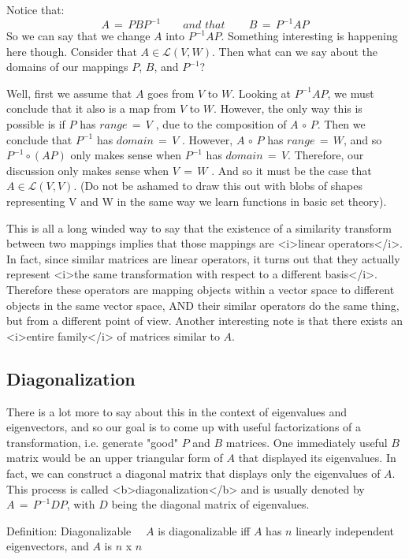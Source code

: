 \documentclass{book}
\begin{document}
    Notice that:$$A\,=\,PBP^{-1}\quad\quad and \,\,that \quad\quad\,B\,=\,P^{-1}AP$$ So we can say that we change $A$ into $P^{-1}AP$. Something interesting is happening here though. Consider that $A \in \mathcal{L}(V,W)$. Then what can we say about the domains of our mappings $P$, $B$, and $P^{-1}$?
    
    Well, first we assume that $A$ goes from $V$ to $W$. Looking at $P^{-1}AP$, we must conclude that it also is a map from $V$ to $W$. However, the only way this is possible is if $P$ has   $range\,=\,V$ , due to the composition of   $A\,\circ\,P$. Then we conclude that $P^{-1}$ has   $domain\,=\,V$ . However,   $A\,\circ\,P$   has   $range\,=\,W$,   and so   $P^{-1}\circ(AP)$     only makes sense when $P^{-1}$ has   $domain\,=\,V$. Therefore, our discussion only makes sense when   $V\,=\,W$ . And so it must be the case that   $A \in \mathcal{L}(V,V)$. (Do not be ashamed to draw this out with blobs of shapes representing V and W in the same way we learn functions in basic set theory).
    
    This is all a long winded way to say that the existence of a similarity transform between two mappings implies that those mappings are <i>linear operators</i>. In fact, since similar matrices are linear operators, it turns out that they actually represent <i>the same transformation with respect to a different basis</i>. Therefore these operators are mapping objects within a vector space to different objects in the same vector space, AND their similar operators do the same thing, but from a different point of view. Another interesting note is that there exists an <i>entire family</i> of matrices similar to $A$.

\subsection{Diagonalization}

    There is a lot more to say about this in the context of eigenvalues and eigenvectors, and so our goal is to come up with useful factorizations of a transformation, i.e. generate "good" $P$ and $B$ matrices. One immediately useful $B$ matrix would be an upper triangular form of $A$ that displayed its eigenvalues. In fact, we can construct a diagonal matrix that displays only the eigenvalues of $A$. This process is called <b>diagonalization</b> and is usually denoted by $A\,=\,P^{-1}DP$, with $D$ being the diagonal matrix of eigenvalues.
    
Definition: Diagonalizable
$\quad$$A$ is diagonalizable iff   $A$   has   $n$   linearly independent eigenvectors, and   $A$   is $n$ x $n$
\end{document}
